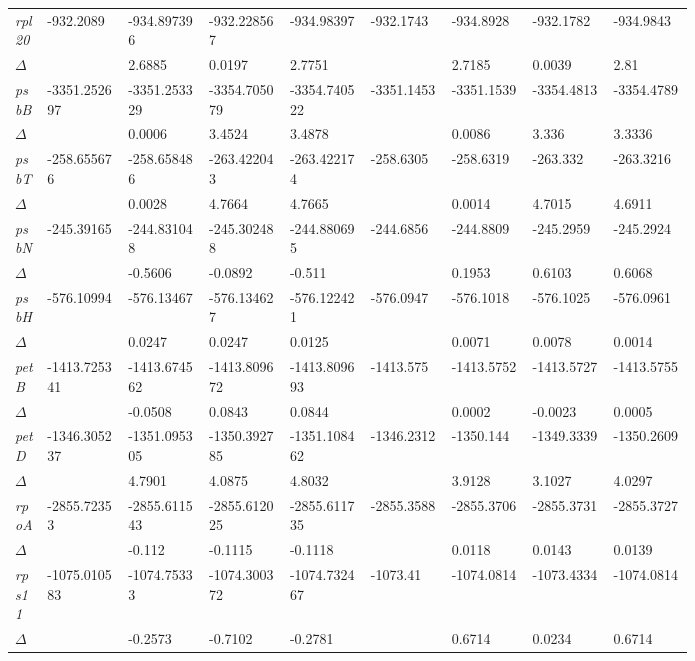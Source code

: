 \documentclass[a4paper]{article}
\begin{document}
\begin{longtable}{p{0.03\linewidth}|p{0.095\linewidth}p{0.095\linewidth}p{0.095\linewidth}p{0.095\linewidth}|p{0.095\linewidth}p{0.095\linewidth}p{0.095\linewidth}p{0.095\linewidth}}
\textit{rpl20} & -932.2089 & -934.897396 & -932.228567 & -934.98397 & -932.1743 & -934.8928 & -932.1782 & -934.9843\\
$\Delta$ &  & 2.6885 & 0.0197 & 2.7751 &  & 2.7185 & 0.0039 & 2.81\\
 \rowcolor{black!20} \textit{psbB} & -3351.252697 & -3351.253329 & -3354.705079 & -3354.740522 & -3351.1453 & -3351.1539 & -3354.4813 & -3354.4789\\
 \rowcolor{black!20} $\Delta$ &  & 0.0006 & 3.4524 & 3.4878 &  & 0.0086 & 3.336 & 3.3336\\
\textit{psbT} & -258.655676 & -258.658486 & -263.422043 & -263.422174 & -258.6305 & -258.6319 & -263.332 & -263.3216\\
$\Delta$ &  & 0.0028 & 4.7664 & 4.7665 &  & 0.0014 & 4.7015 & 4.6911\\
 \rowcolor{black!20} \textit{psbN} & -245.39165 & -244.831048 & -245.302488 & -244.880695 & -244.6856 & -244.8809 & -245.2959 & -245.2924\\
 \rowcolor{black!20} $\Delta$ &  & -0.5606 & -0.0892 & -0.511 &  & 0.1953 & 0.6103 & 0.6068\\
\textit{psbH} & -576.10994 & -576.13467 & -576.134627 & -576.122421 & -576.0947 & -576.1018 & -576.1025 & -576.0961\\
$\Delta$ &  & 0.0247 & 0.0247 & 0.0125 &  & 0.0071 & 0.0078 & 0.0014\\
 \rowcolor{black!20} \textit{petB} & -1413.725341 & -1413.674562 & -1413.809672 & -1413.809693 & -1413.575 & -1413.5752 & -1413.5727 & -1413.5755\\
 \rowcolor{black!20} $\Delta$ &  & -0.0508 & 0.0843 & 0.0844 &  & 0.0002 & -0.0023 & 0.0005\\
\textit{petD} & -1346.305237 & -1351.095305 & -1350.392785 & -1351.108462 & -1346.2312 & -1350.144 & -1349.3339 & -1350.2609\\
$\Delta$ &  & 4.7901 & 4.0875 & 4.8032 &  & 3.9128 & 3.1027 & 4.0297\\
 \rowcolor{black!20} \textit{rpoA} & -2855.72353 & -2855.611543 & -2855.612025 & -2855.611735 & -2855.3588 & -2855.3706 & -2855.3731 & -2855.3727\\
 \rowcolor{black!20} $\Delta$ &  & -0.112 & -0.1115 & -0.1118 &  & 0.0118 & 0.0143 & 0.0139\\
\textit{rps11} & -1075.010583 & -1074.75333 & -1074.300372 & -1074.732467 & -1073.41 & -1074.0814 & -1073.4334 & -1074.0814\\
$\Delta$ &  & -0.2573 & -0.7102 & -0.2781 &  & 0.6714 & 0.0234 & 0.6714\\

\end{longtable}
\end{document}
